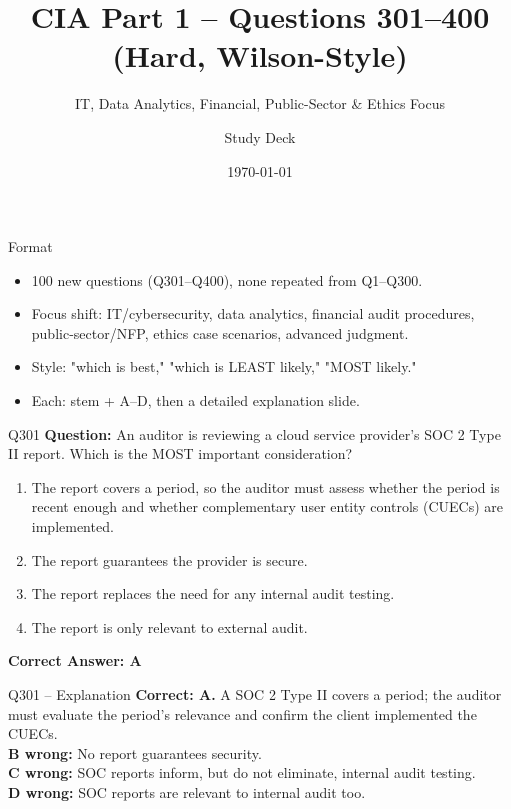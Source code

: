 \documentclass[aspectratio=169,10pt]{beamer}
\title{CIA Part 1 -- Questions 301--400 (Hard, Wilson-Style)}
\subtitle{IT, Data Analytics, Financial, Public-Sector \& Ethics Focus}
\author{Study Deck}
\date{\today}
\begin{document}
	
	\begin{frame}
		\titlepage
	\end{frame}
	
	\begin{frame}{Format}
		\begin{itemize}
			\item 100 new questions (Q301--Q400), none repeated from Q1--Q300.
			\item Focus shift: IT/cybersecurity, data analytics, financial audit procedures, public-sector/NFP, ethics case scenarios, advanced judgment.
			\item Style: "which is best," "which is LEAST likely," "MOST likely."
			\item Each: stem + A--D, then a detailed explanation slide.
		\end{itemize}
	\end{frame}
	
	\begin{frame}[t]{Q301}
		\small
		\textbf{Question:} An auditor is reviewing a cloud service provider's SOC 2 Type II report. Which is the MOST important consideration?
		\begin{enumerate}[label=\Alph*.,itemsep=1pt,topsep=2pt]
			\item The report covers a period, so the auditor must assess whether the period is recent enough and whether complementary user entity controls (CUECs) are implemented.
			\item The report guarantees the provider is secure.
			\item The report replaces the need for any internal audit testing.
			\item The report is only relevant to external audit.
		\end{enumerate}
		\vspace{4pt}
		\textbf{Correct Answer: A}
	\end{frame}
	
	\begin{frame}[t]{Q301 -- Explanation}
		\small
		\textbf{Correct: A.} A SOC 2 Type II covers a period; the auditor must evaluate the period's relevance and confirm the client implemented the CUECs. \\[4pt]
		\textbf{B wrong:} No report guarantees security. \\[2pt]
		\textbf{C wrong:} SOC reports inform, but do not eliminate, internal audit testing. \\[2pt]
		\textbf{D wrong:} SOC reports are relevant to internal audit too.
	\end{frame}
	
\end{document}
